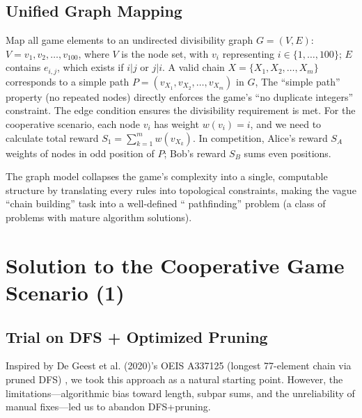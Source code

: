 \documentclass[twocolumn, a4paper]{article}
\begin{document}
\subsection{Unified Graph Mapping}
Map all game elements to an undirected divisibility graph $G=(V, E)$: $V={v_1, v_2, \dots,v_{100}}$, where $V$ is the node set, with $v_i$ representing $i\in \{1, \dots, 100\}$; $E$ contains $e_{i,j}$, which exists if $i | j$ or $j | i$.
A valid chain $X=\{X_1, X_2, \dots, X_m\}$ corresponds to a simple path $P=(v_{X_1}, v_{X_2}, \dots, v_{X_m})$ in $G$, The ``simple path'' property (no repeated nodes) directly enforces the game's ``no duplicate integers'' constraint. The edge condition ensures the divisibility requirement is met. 
For the cooperative scenario, each node $v_i$ has weight $w(v_i)=i$, and we need to calculate total reward $S_1=\sum_{k=1}^{m}w(v_{X_k})$. In competition, Alice's reward $S_A$ weights of nodes in odd position of $P$; Bob's reward $S_B$ sums even positions.

The graph model collapses the game's complexity into a single, computable structure by translating every rules into topological constraints, making the vague ``chain building'' task into a well-defined `` pathfinding'' problem (a class of problems with mature algorithm solutions).


\section{Solution to the Cooperative Game Scenario (1)}
\subsection{Trial on DFS + Optimized Pruning}
Inspired by De Geest et al. (2020)'s OEIS A337125 (longest 77-element chain via pruned DFS) \textsuperscript{\cite{degeest2020a337125}}, we took this approach as a natural starting point. However, the limitations---algorithmic bias toward length, subpar sums, and the unreliability of manual fixes---led us to abandon DFS+pruning.

\end{document}
